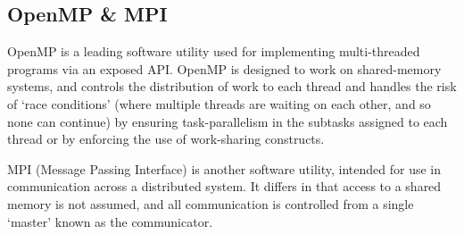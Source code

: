 
\subsection{OpenMP \& MPI}
OpenMP is a leading software utility used for implementing multi-threaded programs via an exposed API. OpenMP is designed to work on shared-memory systems, and controls the distribution of work to each thread and handles the risk of `race conditions' (where multiple threads are waiting on each other, and so none can continue) by ensuring task-parallelism in the subtasks assigned to each thread or by enforcing the use of work-sharing constructs.

MPI (Message Passing Interface) is another software utility, intended for use in communication across a distributed system. It differs in that access to a shared memory is not assumed, and all communication is controlled from a single `master' known as the communicator.



